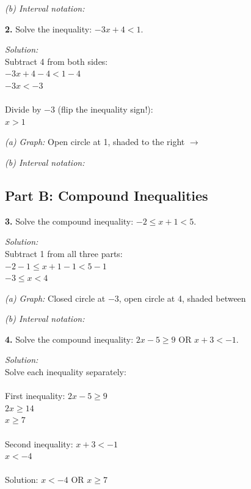 \documentclass[12pt]{article}
\begin{document}
                \textit{(b) Interval notation:} \fbox{$[7, \infty)$}

                \vspace{0.5cm}

            \textbf{2.} Solve the inequality: $-3x + 4 < 1$.

                \textit{Solution:}\\
                Subtract 4 from both sides:\\
                $-3x + 4 - 4 < 1 - 4$\\
                $-3x < -3$\\
                \\
                Divide by $-3$ (flip the inequality sign!):\\
                $x > 1$

                \textit{(a) Graph:} Open circle at 1, shaded to the right $\rightarrow$

                \textit{(b) Interval notation:} 

                \newpage

        \subsection*{Part B: Compound Inequalities}

            \textbf{3.} Solve the compound inequality: $-2 \leq x + 1 < 5$.

                \textit{Solution:}\\
                Subtract 1 from all three parts:\\
                $-2 - 1 \leq x + 1 - 1 < 5 - 1$\\
                $-3 \leq x < 4$

                \textit{(a) Graph:} Closed circle at $-3$, open circle at 4, shaded between

                \textit{(b) Interval notation:} \fbox{$[-3, 4)$}

                \vspace{0.5cm}

            \textbf{4.} Solve the compound inequality: $2x - 5 \geq 9$ OR $x + 3 < -1$.

                \textit{Solution:}\\
                Solve each inequality separately:\\
                \\
                First inequality: $2x - 5 \geq 9$\\
                $2x \geq 14$\\
                $x \geq 7$\\
                \\
                Second inequality: $x + 3 < -1$\\
                $x < -4$\\
                \\
                Solution: $x < -4$ OR $x \geq 7$
\end{document}
